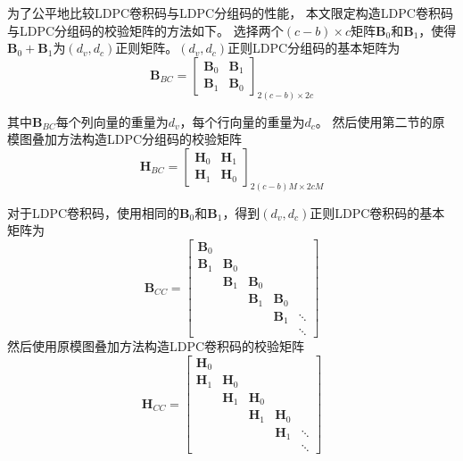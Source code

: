 为了公平地比较LDPC卷积码与LDPC分组码的性能，
本文限定构造LDPC卷积码与LDPC分组码的校验矩阵的方法如下。
选择两个$(c-b)\times c$矩阵$\mathbf{B}_0$和$\mathbf{B}_1$，使得$\mathbf{B}_0 + \mathbf{B}_1$为$(d_v,d_c)$正则矩阵。$(d_v,d_c)$正则LDPC分组码的基本矩阵为
\begin{equation}
    \mathbf{B}_{BC} = \left[
          \begin{array}{cc}
            \mathbf{B}_0 & \mathbf{B}_1\\
            \mathbf{B}_1 & \mathbf{B}_0
          \end{array} \right]_{2(c-b)\times 2c}
\end{equation}

其中$\mathbf{B}_{BC}$每个列向量的重量为$d_v$，每个行向量的重量为$d_c$。
然后使用第二节的原模图叠加方法构造LDPC分组码的校验矩阵
\begin{equation}
    \mathbf{H}_{BC} = \left[
          \begin{array}{cc}
            \mathbf{H}_0 & \mathbf{H}_1\\
            \mathbf{H}_1 & \mathbf{H}_0
          \end{array} \right]_{2(c-b)M \times 2cM}
\end{equation}

对于LDPC卷积码，使用相同的$\mathbf{B}_0$和$\mathbf{B}_1$，得到$(d_v,d_c)$正则LDPC卷积码的基本矩阵为
\begin{equation}
    \mathbf{B}_{CC} = \left[
          \begin{array}{ccccc}
            \mathbf{B}_0 & & & & \\
            \mathbf{B}_1 & \mathbf{B}_0 & & & \\
             & \mathbf{B}_1 & \mathbf{B}_0 & & \\
             & & \mathbf{B}_1 & \mathbf{B}_0 & \\
             & & & \mathbf{B}_1 & \ddots \\
             & & & & \ddots
          \end{array} \right]
\end{equation}
然后使用原模图叠加方法构造LDPC卷积码的校验矩阵
\begin{equation}
    \mathbf{H}_{CC} = \left[
          \begin{array}{ccccc}
            \mathbf{H}_0 & & & & \\
            \mathbf{H}_1 & \mathbf{H}_0 & & & \\
             & \mathbf{H}_1 & \mathbf{H}_0 & & \\
             & & \mathbf{H}_1 & \mathbf{H}_0 & \\
             & & & \mathbf{H}_1 & \ddots \\
             & & & & \ddots
          \end{array} \right]
\end{equation}

